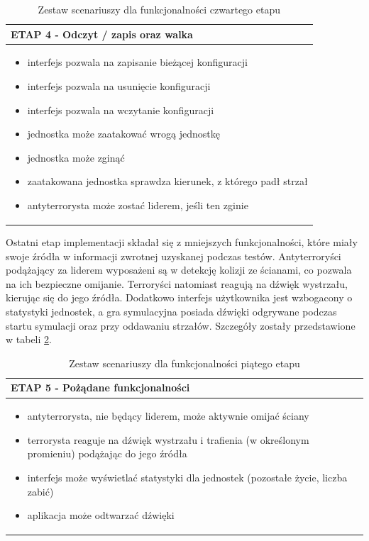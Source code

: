 \begin{table}
\begin{center}
\begin{tabular}{|p{}|}
\hline
ETAP 4 - Odczyt / zapis oraz walka\\\hline
	\begin{itemize}
		\setlength\itemsep{0pt}
		\item interfejs pozwala na zapisanie bieżącej konfiguracji
		\item interfejs pozwala na usunięcie konfiguracji
		\item interfejs pozwala na wczytanie konfiguracji
		\item jednostka może zaatakować wrogą jednostkę
		\item jednostka może zginąć
		\item zaatakowana jednostka sprawdza kierunek, z którego padł strzał
		\item antyterrorysta może zostać liderem, jeśli ten zginie
	\end{itemize}
\\\hline
\end{tabular}
\caption {Zestaw scenariuszy dla funkcjonalności czwartego etapu\label{scenarios4}}
\end{center}
\end{table} 

Ostatni etap implementacji składał się z mniejszych funkcjonalności, które miały swoje źródła w informacji zwrotnej uzyskanej podczas testów. Antyterroryści podążający za liderem wyposażeni są w detekcję kolizji ze ścianami, co pozwala na ich bezpieczne omijanie. Terroryści natomiast reagują na dźwięk wystrzału, kierując się do jego źródła. Dodatkowo interfejs użytkownika jest wzbogacony o statystyki jednostek, a gra symulacyjna posiada dźwięki odgrywane podczas startu symulacji oraz przy oddawaniu strzałów. Szczegóły zostały przedstawione w tabeli \ref{scenarios5}.

\begin{table}
\begin{center}
\begin{tabular}{|p{}|}
\hline
ETAP 5 - Pożądane funkcjonalności\\\hline
	\begin{itemize}
		\setlength\itemsep{0pt}
		\item antyterrorysta, nie będący liderem, może aktywnie omijać ściany
		\item terrorysta reaguje na dźwięk wystrzału i trafienia (w określonym promieniu) podążając do jego źródła
		\item interfejs może wyświetlać statystyki dla jednostek (pozostałe życie, liczba zabić)
		\item aplikacja może odtwarzać dźwięki
	\end{itemize}
\\\hline
\end{tabular}
\caption {Zestaw scenariuszy dla funkcjonalności piątego etapu\label{scenarios5}}
\end{center}
\end{table} 

